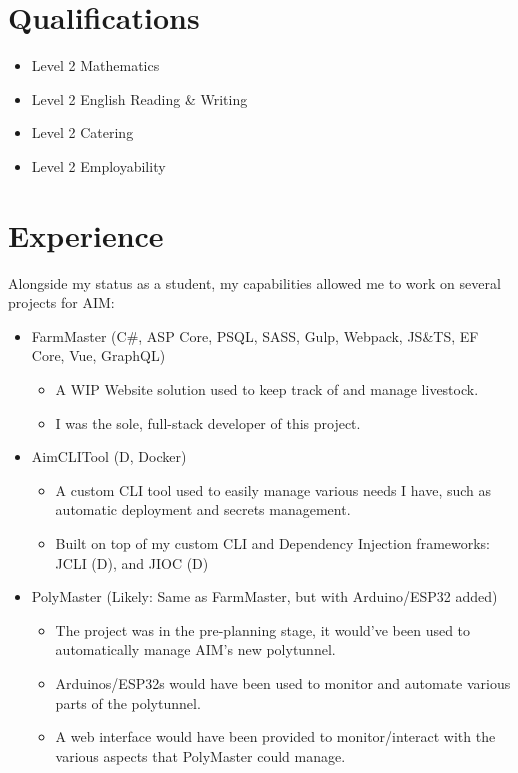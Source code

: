 \documentclass[11pt,a4paper,sans]{moderncv}
\title{}
\begin{document}
\makecvtitle

\section{Qualifications}
{
    \begin{itemize}
        \item Level 2 Mathematics
        \item Level 2 English Reading \& Writing
        \item Level 2 Catering
        \item Level 2 Employability
    \end{itemize}
}
{
}

\section{Experience}
{
    Alongside my status as a student, my capabilities allowed me to work on
    several projects for AIM:
    \begin{itemize}
        \item FarmMaster (C\#, ASP Core, PSQL, SASS, Gulp, Webpack, JS\&TS, EF Core, Vue, GraphQL)
        \begin{itemize}
            \item A WIP Website solution used to keep track of and manage livestock.
            \item I was the sole, full-stack developer of this project.
        \end{itemize}
        \item AimCLITool (D, Docker)
        \begin{itemize}
            \item A custom CLI tool used to easily manage various needs I have, such as automatic deployment and secrets management.
            \item Built on top of my custom CLI and Dependency Injection frameworks: JCLI (D), and JIOC (D)
        \end{itemize}
        \item PolyMaster (Likely: Same as FarmMaster, but with Arduino/ESP32 added)
        \begin{itemize}
            \item The project was in the pre-planning stage, it would've been used to automatically manage AIM's new polytunnel.
            \item Arduinos/ESP32s would have been used to monitor and automate various parts of the polytunnel.
            \item A web interface would have been provided to monitor/interact with the various aspects that PolyMaster could manage.
        \end{itemize}
    \end{itemize}
}
\end{document}

